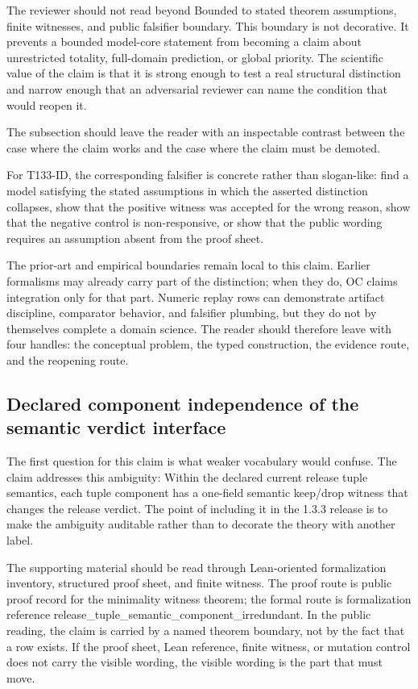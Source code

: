 The reviewer should not read beyond Bounded to stated theorem assumptions, finite witnesses, and public falsifier boundary. This boundary is not decorative. It prevents a bounded model-core statement from becoming a claim about unrestricted totality, full-domain prediction, or global priority. The scientific value of the claim is that it is strong enough to test a real structural distinction and narrow enough that an adversarial reviewer can name the condition that would reopen it.

The subsection should leave the reader with an inspectable contrast between the case where the claim works and the case where the claim must be demoted.

For T133-ID, the corresponding falsifier is concrete rather than slogan-like: find a model satisfying the stated assumptions in which the asserted distinction collapses, show that the positive witness was accepted for the wrong reason, show that the negative control is non-responsive, or show that the public wording requires an assumption absent from the proof sheet.

The prior-art and empirical boundaries remain local to this claim. Earlier formalisms may already carry part of the distinction; when they do, OC claims integration only for that part. Numeric replay rows can demonstrate artifact discipline, comparator behavior, and falsifier plumbing, but they do not by themselves complete a domain science. The reader should therefore leave with four handles: the conceptual problem, the typed construction, the evidence route, and the reopening route.

\subsection{Declared component independence of the semantic verdict interface}
The first question for this claim is what weaker vocabulary would confuse. The claim addresses this ambiguity: Within the declared current release tuple semantics, each tuple component has a one-field semantic keep/drop witness that changes the release verdict. The point of including it in the 1.3.3 release is to make the ambiguity auditable rather than to decorate the theory with another label.

The supporting material should be read through Lean-oriented formalization inventory, structured proof sheet, and finite witness. The proof route is public proof record for the minimality witness theorem; the formal route is formalization reference release\_tuple\_semantic\_component\_irredundant. In the public reading, the claim is carried by a named theorem boundary, not by the fact that a row exists. If the proof sheet, Lean reference, finite witness, or mutation control does not carry the visible wording, the visible wording is the part that must move.

